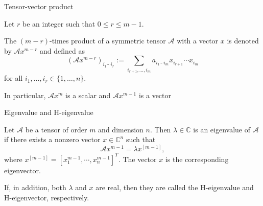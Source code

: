 \documentclass[10pt,compress,t,noamsthm,notheorem,table,handout]{beamer}
\theoremstyle{nonumberbreak}%
\newcommand{\myem}[2][blue]{{\color{#1} #2}}
\newcommand{\mycite}[1]{\textcolor{red}{\normalfont\upshape{#1}}}
\newcommand{\A}{\mathcal{A}}
\begin{document}

\begin{frame}{Tensor-vector product}

Let $r$ be an integer such that $0\leq r\leq m-1$.

\begin{Block}
The $(m-r)$-times product of a symmetric tensor $\A$
with a vector $x$ is denoted by $\A x^{m-r}$
and defined as %
$$
  (\A x^{m-r})_{i_1\cdots i_r}
  := \sum_{i_{r+1},\ldots, i_m}a_{i_1\cdots i_m}
  x_{i_{r+1}}\cdots x_{i_m}
$$
for all $i_1,\ldots,i_r\in\{1,\ldots,n\}$.
\end{Block}

\bigskip

In particular, $\A x^m$ is a scalar and $\A x^{m-1}$ is a vector

\end{frame}


\begin{frame}{Eigenvalue and H-eigenvalue}


\begin{definition} [Eigenvalue, \mycite{[Qi '05, Lim '05]}]
  Let $\A$ be a tensor of order $m$ and dimension $n$.
  Then $\lambda\in\mathbb{C}$ is an eigenvalue of $\A$ if there exists a nonzero vector
  $x\in\mathbb{C}^n$ such that
  $$ %
    \A x^{m-1}=\lambda x^{[m-1]},
  $$
  where $x^{[m-1]}=[x_1^{m-1},\cdots,x_n^{m-1}]^T$.
  The vector $x$ is the corresponding eigenvector.
\end{definition}

\bigskip
{}
  If, in addition, both $\lambda$ and $x$ are real, then
  they are called the \myem{H-eigenvalue} and \myem{H-eigenvector}, respectively.

\end{frame}
\end{document}
